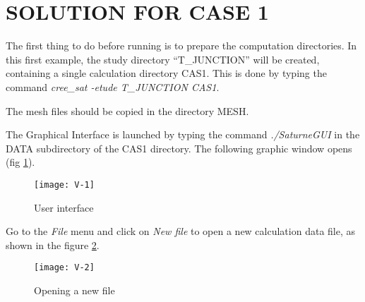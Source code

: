 %
%
%
%
%
%
%
\section{SOLUTION FOR CASE 1}
The first thing to do before running \CS is to prepare the computation
directories. In this first example, the study directory ``T\_JUNCTION'' will be
created, containing a single calculation directory CAS1. This is done by typing
the command {\itshape cree\_sat -etude T\_JUNCTION CAS1}.

The mesh files should be copied in the directory MESH.

The \CS Graphical Interface is launched by typing the command
{\itshape ./SaturneGUI} in the DATA subdirectory of the CAS1 directory.
The following graphic window opens (fig \ref{fig1_e1}).

\begin{figure}[ht]
\begin{center}
\texttt{[image: V-1]}
\caption{User interface}
\label{fig1_e1}
\end{center}
\end{figure}


\clearpage
Go to the {\itshape File} menu and click on {\itshape New file} to open a new
calculation data file, as shown in the figure
\ref{fig2_e1}.

\begin{figure}[ht]
\begin{center}
\texttt{[image: V-2]}
\caption{Opening a new file}
\label{fig2_e1}
\end{center}
\end{figure}


